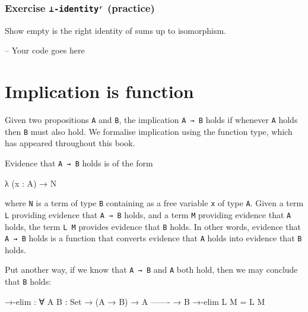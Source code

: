 \hypertarget{exercise--identityux2b3-practice}{%
\subsubsection{\texorpdfstring{Exercise \texttt{⊥-identityʳ}
(practice)}{Exercise ⊥-identityʳ (practice)}}\label{exercise--identityux2b3-practice}}

Show empty is the right identity of sums up to isomorphism.

\begin{fence}
\begin{code}
-- Your code goes here
\end{code}
\end{fence}

\hypertarget{Connectives-implication}{%
\section{Implication is function}\label{Connectives-implication}}

Given two propositions \texttt{A} and \texttt{B}, the implication
\texttt{A\ →\ B} holds if whenever \texttt{A} holds then \texttt{B} must
also hold. We formalise implication using the function type, which has
appeared throughout this book.

Evidence that \texttt{A\ →\ B} holds is of the form

\begin{myDisplay}
λ (x : A) → N
\end{myDisplay}

where \texttt{N} is a term of type \texttt{B} containing as a free
variable \texttt{x} of type \texttt{A}. Given a term \texttt{L}
providing evidence that \texttt{A\ →\ B} holds, and a term \texttt{M}
providing evidence that \texttt{A} holds, the term \texttt{L\ M}
provides evidence that \texttt{B} holds. In other words, evidence that
\texttt{A\ →\ B} holds is a function that converts evidence that
\texttt{A} holds into evidence that \texttt{B} holds.

Put another way, if we know that \texttt{A\ →\ B} and \texttt{A} both
hold, then we may conclude that \texttt{B} holds:

\begin{fence}
\begin{code}
→-elim : ∀ {A B : Set}
  → (A → B)
  → A
    -------
  → B
→-elim L M = L M
\end{code}
\end{fence}

